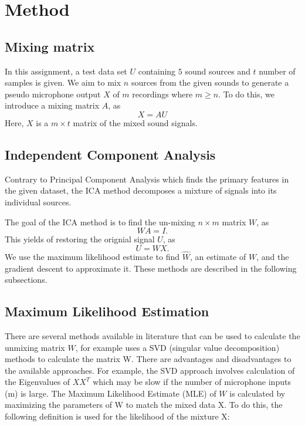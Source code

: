 \documentclass[conference]{IEEEtran}
\begin{document}
\section{Method}
\label{sec:method}

\subsection{Mixing matrix}
In this assignment, a test data set $U$ containing $5$ sound sources and $t$ number of samples is given. We aim to mix $n$ sources from the given sounds to generate a pseudo microphone output $X$ of $m$ recordings where $m\geq n$. To do this, we introduce a mixing matrix $A$, as
\begin{equation}
    X = AU
\end{equation}
Here, $X$ is a $m \times t$ matrix of the mixed sound signals.


\subsection{Independent Component Analysis}

Contrary to Principal Component Analysis which finds the primary features in the given dataset, the ICA method decomposes a mixture of signals into its individual sources. 

The goal of the ICA method is to find the un-mixing $n \times m$ matrix $W$, as
\begin{equation}
    WA = I.
\end{equation}
This yields of restoring the orignial signal $U$, as
\begin{equation}
    U = WX.
\end{equation}
We use the maximum likelihood estimate to find $\hat{W}$, an estimate of $W$, and the gradient descent to approximate it. These methods are described in the following subsections.


\subsection{Maximum Likelihood Estimation}
There are several methods available in literature that can be used to calculate the unmixing matrix $W$, \cite{} for example uses a SVD (singular value decomposition) methods to calculate the matrix W. There are advantages and disadvantages to the available approaches. For example, the SVD approach involves calculation of the Eigenvalues of $XX^T$ which may be slow if the number of microphone inputs (m) is large.
The Maximum Likelihood Estimate (MLE) of $W$ is calculated by maximizing the parameters of W to match the mixed data X. To do this, the following definition is used for the likelihood of the mixture X:
\end{document}
